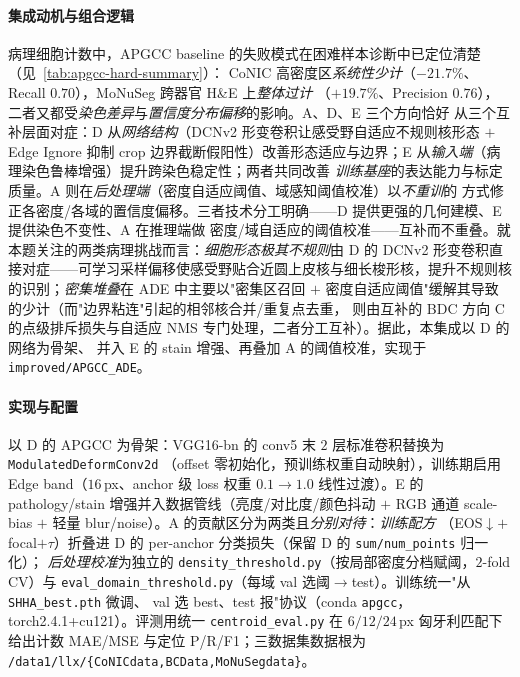 \paragraph{集成动机与组合逻辑}
病理细胞计数中，APGCC baseline 的失败模式在困难样本诊断中已定位清楚（见~\ref{tab:apgcc-hard-summary}）：
CoNIC 高密度区\emph{系统性少计}（$-21.7\%$、Recall $0.70$），MoNuSeg 跨器官 H\&E 上\emph{整体过计}
（$+19.7\%$、Precision $0.76$），二者又都受\emph{染色差异}与\emph{置信度分布偏移}的影响。A、D、E 三个方向恰好
从三个互补层面对症：D 从\emph{网络结构}（DCNv2 形变卷积让感受野自适应不规则核形态 $+$ Edge Ignore 抑制 crop
边界截断假阳性）改善形态适应与边界；E 从\emph{输入端}（病理染色鲁棒增强）提升跨染色稳定性；两者共同改善
\emph{训练基座}的表达能力与标定质量。A 则在\emph{后处理端}（密度自适应阈值、域感知阈值校准）以\emph{不重训}的
方式修正各密度/各域的置信度偏移。三者技术分工明确——D 提供更强的几何建模、E 提供染色不变性、A 在推理端做
密度/域自适应的阈值校准——互补而不重叠。就本题关注的两类病理挑战而言：\emph{细胞形态极其不规则}由 D 的 DCNv2
形变卷积直接对症——可学习采样偏移使感受野贴合近圆上皮核与细长梭形核，提升不规则核的识别；\emph{密集堆叠}在
ADE 中主要以"密集区召回 $+$ 密度自适应阈值"缓解其导致的少计（而"边界粘连"引起的相邻核合并/重复点去重，
则由互补的 BDC 方向 C 的点级排斥损失与自适应 NMS 专门处理，二者分工互补）。据此，本集成以 D 的网络为骨架、
并入 E 的 stain 增强、再叠加 A 的阈值校准，实现于 \texttt{improved/APGCC\_ADE}。

\paragraph{实现与配置}
以 D 的 APGCC 为骨架：VGG16-bn 的 conv5 末 $2$ 层标准卷积替换为 \texttt{ModulatedDeformConv2d}
（offset 零初始化，预训练权重自动映射），训练期启用 Edge band（$16$\,px、anchor 级 loss 权重
$0.1\!\to\!1.0$ 线性过渡）。E 的 pathology/stain 增强并入数据管线（亮度/对比度/颜色抖动 $+$ RGB 通道
scale-bias $+$ 轻量 blur/noise）。A 的贡献区分为两类且\emph{分别对待}：\emph{训练配方}
（EOS$\downarrow$$+$focal$+$$\tau$）折叠进 D 的 per-anchor 分类损失（保留 D 的 \texttt{sum/num\_points} 归一化）；
\emph{后处理校准}为独立的 \texttt{density\_threshold.py}（按局部密度分档赋阈，$2$-fold CV）与
\texttt{eval\_domain\_threshold.py}（每域 val 选阈$\to$test）。训练统一"从 \texttt{SHHA\_best.pth} 微调、
val 选 best、test 报"协议（conda \texttt{apgcc}，torch2.4.1+cu121）。评测用统一 \texttt{centroid\_eval.py}
在 $6/12/24$\,px 匈牙利匹配下给出计数 MAE/MSE 与定位 P/R/F1；三数据集数据根为
\texttt{/data1/llx/\{CoNICdata,BCData,MoNuSegdata\}}。

